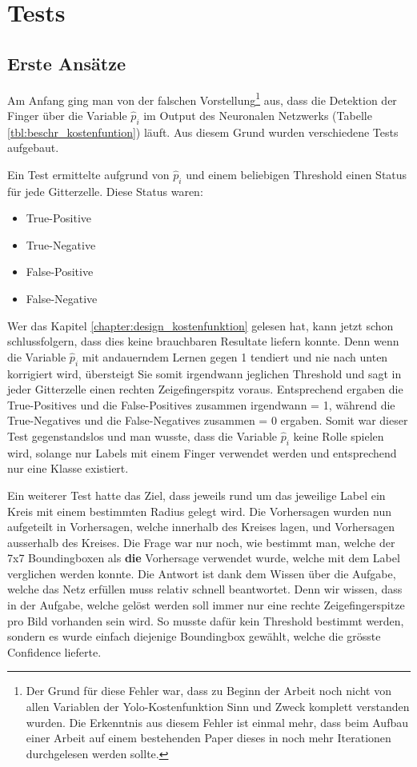 \newpage
\section{Tests} 
\label{chapter:tests}
\subsection{Erste Ansätze}
Am Anfang ging man von der falschen Vorstellung\footnote{\label{grund_falscher_test}Der Grund für diese Fehler war, dass zu Beginn der Arbeit noch nicht von allen Variablen der Yolo-Kostenfunktion Sinn und Zweck komplett verstanden wurden. Die Erkenntnis aus diesem Fehler ist einmal mehr, dass beim Aufbau einer Arbeit auf einem bestehenden Paper dieses in noch mehr Iterationen durchgelesen werden sollte.} aus, dass die Detektion der Finger über die Variable $\hat{p}_i$ im Output des Neuronalen Netzwerks (Tabelle \ref{tbl:beschr_kostenfuntion}) läuft. 
Aus diesem Grund wurden verschiedene Tests aufgebaut.

Ein Test ermittelte aufgrund von $\hat{p}_i$ und einem beliebigen Threshold einen Status für jede Gitterzelle. Diese Status waren: 

\begin{itemize}
\item \grqq{}True-Positive\grqq{}
\item \grqq{}True-Negative\grqq{}
\item \grqq{}False-Positive\grqq{}
\item \grqq{}False-Negative\grqq{}
\end{itemize}

Wer das Kapitel \ref{chapter:design_kostenfunktion} gelesen hat, kann jetzt schon schlussfolgern, dass dies keine brauchbaren Resultate liefern konnte.
Denn wenn die Variable $\hat{p}_i$ mit andauerndem Lernen gegen 1 tendiert und nie nach unten korrigiert wird, übersteigt Sie somit irgendwann jeglichen Threshold und sagt in jeder Gitterzelle einen rechten Zeigefingerspitz voraus. 
Entsprechend ergaben die \grqq{}True-Positives\grqq{} und die \grqq{}False-Positives\grqq{} zusammen irgendwann = 1, während die \grqq{}True-Negatives\grqq{} und die \grqq{}False-Negatives\grqq{} zusammen = 0 ergaben.
Somit war dieser Test gegenstandslos und man wusste, dass die Variable $\hat{p}_i$ keine Rolle spielen wird, solange nur Labels mit einem Finger verwendet werden und entsprechend nur eine Klasse existiert.

Ein weiterer Test hatte das Ziel, dass jeweils rund um das jeweilige Label ein Kreis mit einem bestimmten Radius gelegt wird.
Die Vorhersagen wurden nun aufgeteilt in Vorhersagen, welche innerhalb des Kreises lagen, und Vorhersagen ausserhalb des Kreises.
Die Frage war nur noch, wie bestimmt man, welche der 7x7 Boundingboxen als \textbf{die} Vorhersage verwendet wurde, welche mit dem Label verglichen werden konnte.
Die Antwort ist dank dem Wissen über die Aufgabe, welche das Netz erfüllen muss relativ schnell beantwortet.
Denn wir wissen, dass in der Aufgabe, welche gelöst werden soll immer nur eine rechte Zeigefingerspitze pro Bild vorhanden sein wird.
So musste dafür kein Threshold bestimmt werden, sondern es wurde einfach diejenige Boundingbox gewählt, welche die grösste Confidence lieferte.

